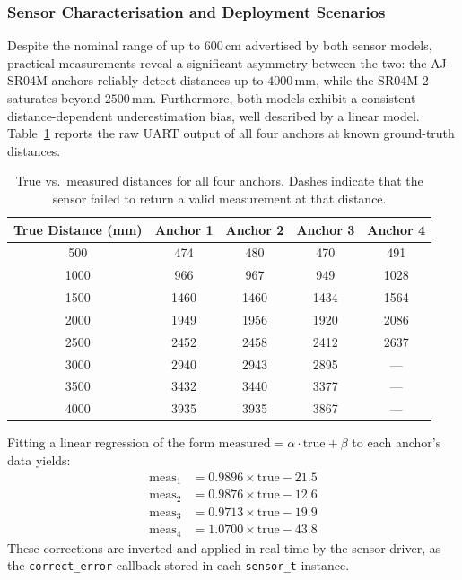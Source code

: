 \subsubsection{Sensor Characterisation and Deployment Scenarios}
\label{subsec:sensor-char}

Despite the nominal range of up to $600\,\text{cm}$ advertised by both sensor models, practical measurements reveal a significant asymmetry between the two: the AJ-SR04M anchors reliably detect distances up to $4000\,\text{mm}$, while the SR04M-2 saturates beyond $2500\,\text{mm}$. Furthermore, both models exhibit a consistent distance-dependent underestimation bias, well described by a linear model. Table~\ref{tab:distance_calibration} reports the raw UART output of all four anchors at known ground-truth distances.

\begin{table}[ht]
    \caption{True vs.\ measured distances for all four anchors. Dashes indicate that the sensor failed to return a valid measurement at that distance.}
    \label{tab:distance_calibration}
    \centering
    \begin{tabular}{ccccc}
        \toprule
        True Distance (mm) & Anchor 1 & Anchor 2 & Anchor 3 & Anchor 4 \\
        \midrule
         500 &  474 &  480 &  470 &  491 \\
        1000 &  966 &  967 &  949 & 1028 \\
        1500 & 1460 & 1460 & 1434 & 1564 \\
        2000 & 1949 & 1956 & 1920 & 2086 \\
        2500 & 2452 & 2458 & 2412 & 2637 \\
        3000 & 2940 & 2943 & 2895 &  --- \\
        3500 & 3432 & 3440 & 3377 &  --- \\
        4000 & 3935 & 3935 & 3867 &  --- \\
        \bottomrule
    \end{tabular}
\end{table}

Fitting a linear regression of the form $\text{measured} = \alpha \cdot \text{true} + \beta$ to each anchor's data yields:
\begin{align*}
    \text{meas}_1 &= 0.9896\times\text{true} - 21.5 \\
    \text{meas}_2 &= 0.9876\times\text{true} - 12.6 \\
    \text{meas}_3 &= 0.9713\times\text{true} - 19.9 \\
    \text{meas}_4 &= 1.0700\times\text{true} - 43.8
\end{align*}
These corrections are inverted and applied in real time by the sensor driver, as the \texttt{correct\_error} callback stored in each \texttt{sensor\_t} instance.

